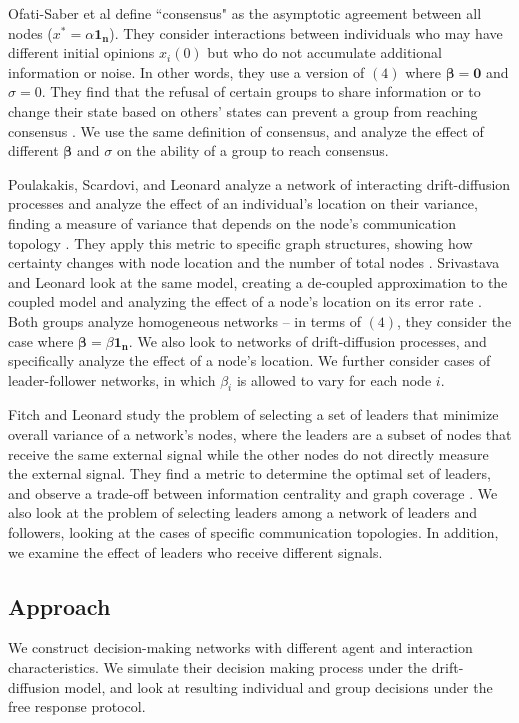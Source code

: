 \documentclass[pageno]{jpaper}
\begin{document}
Ofati-Saber et al define ``consensus" as the asymptotic agreement between all nodes ($x^*=\alpha\mathbf{1_n}$). They consider interactions between individuals who may have different initial opinions $x_i(0)$ but who do not accumulate additional information or noise. In other words, they use a version of $(4)$ where $\mathbf{\beta}=\mathbf{0}$ and $\sigma=0$. They find that the refusal of certain groups to share information or to change their state based on others' states can prevent a group from reaching consensus \cite{olfati-saber_consensus_2007}. We use the same definition of consensus, and analyze the effect of different $\mathbf{\beta}$ and $\sigma$ on the ability of a group to reach consensus.

Poulakakis, Scardovi, and Leonard analyze a network of interacting drift-diffusion processes and analyze the effect of an individual's location on their variance, finding a measure of variance that depends on the node's communication topology \cite{poulakakis_node_2012}. They apply this metric to specific graph structures, showing how certainty changes with node location and the number of total nodes \cite{poulakakis_node_2012-1}. Srivastava and Leonard look at the same model, creating a de-coupled approximation to the coupled model and analyzing the effect of a node's location on its error rate \cite{srivastava_collective_2014}. Both groups analyze homogeneous networks -- in terms of $(4)$, they consider the case where $\mathbf{\beta}=\beta\mathbf{1_n}$. We also look to networks of drift-diffusion processes, and specifically analyze the effect of a node's location. We further consider cases of leader-follower networks, in which $\beta_i$ is allowed to vary for each node $i$.

Fitch and Leonard study the problem of selecting a set of leaders that minimize overall variance of a network's nodes, where the leaders are a subset of nodes that receive the same external signal while the other nodes do not directly measure the external signal. They find a metric to determine the optimal set of leaders, and observe a trade-off between information centrality and graph coverage \cite{fitch_joint_2016}. We also look at the problem of selecting leaders among a network of leaders and followers, looking at the cases of specific communication topologies. In addition, we examine the effect of leaders who receive different signals.

\subsection{Approach}
We construct decision-making networks with different agent and interaction characteristics. We simulate their decision making process under the drift-diffusion model, and look at resulting individual and group decisions under the free response protocol.
\end{document}
